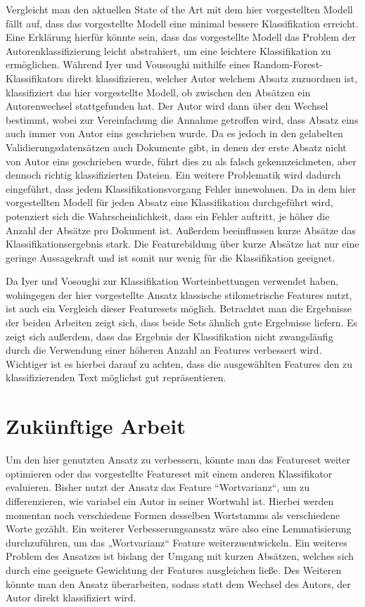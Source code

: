 \documentclass[conference]{IEEEtran}
\begin{document}
	
	
	Vergleicht man den aktuellen State of the Art mit dem hier vorgestellten Modell fällt auf, dass das vorgestellte Modell eine minimal bessere Klassifikation erreicht. Eine Erklärung hierfür könnte sein, dass das vorgestellte Modell das Problem der Autorenklassifizierung leicht abstrahiert, um eine leichtere Klassifikation zu ermöglichen. Während Iyer und Vousoughi mithilfe eines Random-Forest-Klassifikators direkt klassifizieren, welcher Autor welchem Absatz zuzuordnen ist, klassifiziert das hier vorgestellte Modell, ob zwischen den Absätzen ein Autorenwechsel stattgefunden hat. Der Autor wird dann über den Wechsel bestimmt, wobei zur Vereinfachung die Annahme getroffen wird, dass Absatz eins auch immer von Autor eins geschrieben wurde. Da es jedoch in den gelabelten Validierungsdatensätzen auch Dokumente gibt, in denen der erste Absatz nicht von Autor eins geschrieben wurde, führt dies zu als falsch gekennzeichneten, aber dennoch richtig klassifizierten Dateien. Ein weitere Problematik wird dadurch eingeführt, dass jedem Klassifikationsvorgang Fehler innewohnen. Da in dem hier vorgestellten Modell für jeden Absatz eine Klassifikation durchgeführt wird, potenziert sich die Wahrscheinlichkeit, dass ein Fehler auftritt, je höher die Anzahl der Absätze pro Dokument ist. Außerdem beeinflussen kurze Absätze das Klassifikationsergebnis stark. Die Featurebildung über kurze Absätze hat nur eine geringe Aussagekraft und ist somit nur wenig für die Klassifikation geeignet. 
	 
	
	
	Da Iyer und Vosoughi zur Klassifikation Worteinbettungen verwendet haben, wohingegen der hier vorgestellte Ansatz klassische stilometrische Features nutzt, ist auch ein Vergleich dieser Featuresets möglich. Betrachtet man die Ergebnisse der beiden Arbeiten zeigt sich, dass beide Sets ähnlich gute Ergebnisse liefern. Es zeigt sich außerdem, dass das Ergebnis der Klassifikation nicht zwangsläufig durch die Verwendung einer höheren Anzahl an Features verbessert wird. Wichtiger ist es hierbei darauf zu achten, dass die ausgewählten Features den zu klassifizierenden Text möglichst gut repräsentieren.
	
	
	\section{Zukünftige Arbeit}
	Um den hier genutzten Ansatz zu verbessern, könnte man das Featureset weiter optimieren oder das vorgestellte Featureset mit einem anderen Klassifikator evaluieren. Bisher nutzt der Ansatz das Feature “Wortvarianz“, um zu differenzieren, wie variabel ein Autor in seiner Wortwahl ist. Hierbei werden momentan noch verschiedene Formen desselben Wortstamms als verschiedene Worte gezählt. Ein weiterer Verbesserungsansatz wäre also eine Lemmatisierung durchzuführen, um das „Wortvarianz“ Feature weiterzuentwickeln. Ein weiteres Problem des Ansatzes ist bislang der Umgang mit kurzen Absätzen, welches sich durch eine geeignete Gewichtung der Features ausgleichen ließe. Des Weiteren könnte man den Ansatz überarbeiten, sodass statt dem Wechsel des Autors, der Autor direkt klassifiziert wird.
	
\end{document}
